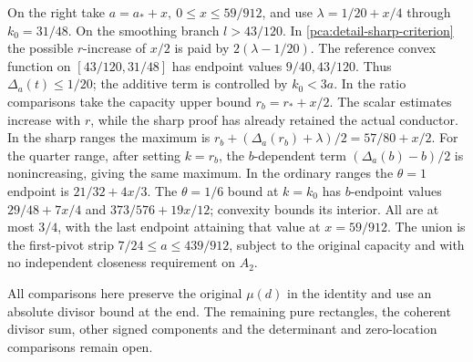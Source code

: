 On the right take \(a=a_*+x,\ 0\le x\le59/912\), and use
\(\lambda=1/20+x/4\) through \(k_0=31/48\).
On the smoothing branch \(l>43/120\). In
\eqref{pca:detail-sharp-criterion} the possible \(r\)-increase
of \(x/2\) is paid by \(2(\lambda-1/20)\).
The reference convex function on \([43/120,31/48]\) has
endpoint values \(9/40,43/120\). Thus \(\Delta_a(t)\le1/20\);
the additive term is controlled by \(k_0<3a\).
In the ratio comparisons take the capacity upper bound
\(r_b=r_*+x/2\). The scalar estimates increase with \(r\),
while the sharp proof has already retained the actual conductor.
In the sharp ranges the maximum is
\(r_b+(\Delta_a(r_b)+\lambda)/2=57/80+x/2\).
For the quarter range, after setting \(k=r_b\),
the \(b\)-dependent term \((\Delta_a(b)-b)/2\) is
nonincreasing, giving the same maximum.
In the ordinary ranges the \(\theta=1\) endpoint is
\(21/32+4x/3\). The \(\theta=1/6\) bound at \(k=k_0\)
has \(b\)-endpoint values \(29/48+7x/4\) and
\(373/576+19x/12\); convexity bounds its interior.
All are at most \(3/4\), with the last endpoint attaining
that value at \(x=59/912\).
The union is the first-pivot strip
\(7/24\le a\le439/912\), subject to the original capacity
and with no independent closeness requirement on \(A_2\).

All comparisons here preserve the original \(\mu(d)\) in
the identity and use an absolute divisor bound at the end.
The remaining pure rectangles, the coherent divisor sum,
other signed components and the determinant and zero-location
comparisons remain open.

